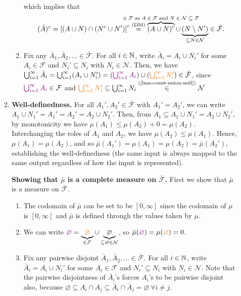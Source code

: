 \begin{enumerate}
\begin{pf}
\begin{enumerate}
\begin{enumerate}[label={(\arabic*)}]
which implies that
\[
(\bar{A})^c=\left[(A\cup N)\cap(N^c\cup N')\right]^{c}
\overset{\text{(DM)}}{=}
\overbrace{(A\cup N)^{c}}^{
\mathclap{\text{\(\in\mathcal{F}\) as \(A\in\mathcal{F}\) and \(N\in\mathcal{N}\subseteq \mathcal{F}\)}}}
\cup \underbrace{(N\setminus N')}_{\subseteq N\in\mathcal{N}}
\in\bar{\mathcal{F}}.
\]
\item Fix any
\(\bar{A}_1,\bar{A}_2,\dotsc\in\bar{\mathcal{F}}\). For all
\(i\in\mathbb{N}\), write \(\bar{A}_i=A_i\cup N_i'\) for some
\(A_i\in\mathcal{F}\) and \(N_i'\subseteq N_i\) with \(N_i\in\mathcal{N}\).
Then, we have \(\bigcup_{i=1}^{\infty}\bar{A}_i
=\bigcup_{i=1}^{\infty}(A_i\cup N_i')
=(\vc{\bigcup_{i=1}^{\infty}A_i})\cup(\orc{\bigcup_{i=1}^{\infty}N_i'})\in\bar{\mathcal{F}}
\), since \(\vc{\bigcup_{i=1}^{\infty}A_i}\in\mathcal{F}\) and
\(\orc{\bigcup_{i=1}^{\infty}N_i'}\subseteq
\bigcup_{i=1}^{\infty}N_i\overset{\text{(\Cref{lma:count-union-null})}}{\in}\mathcal{N}\)
\end{enumerate}
\item \textbf{Well-definedness.} For all
\(A_1',A_2'\in\bar{\mathcal{F}}\) with \(A_1'=A_2'\), we can write
\(A_1\cup N_1'=A_1'=A_2'=A_2\cup N_2'\). Then, from \(A_1\subseteq A_1\cup
N_1'=A_2\cup N_2'\), by monotonicity we have
\(\mu(A_1)\le\mu(A_2)+0=\mu(A_2)\). Interchanging the roles of \(A_1\) and
\(A_2\), we have \(\mu(A_2)\le\mu(A_1)\). Hence, \(\mu(A_1)=\mu(A_2)\), and so
\(\bar{\mu}(A_1')=\mu(A_1)=\mu(A_2)=\bar{\mu}(A_2')\), establishing
the well-definedness (the same input is always mapped to the same output
regardless of how the input is represented).

\textbf{Showing that \(\bar{\mu}\) is a complete measure on \(\bar{\mathcal{F}}\).}
First we show that \(\bar{\mu}\) is a measure on \(\bar{\mathcal{F}}\).
\begin{enumerate}[label={(\arabic*)}]
\item The codomain of \(\bar{\mu}\) can be set to be \([0,\infty]\) since the
codomain of \(\mu\) is \([0,\infty]\) and \(\bar{\mu}\) is defined through
the values taken by \(\mu\).
\item  We can write
\(\vc{\varnothing}=\underbrace{\orc{\varnothing}}_{\in\mathcal{F}}\cup\underbrace{\varnothing}_{\subseteq
\varnothing\in\mathcal{N}}\), so
\(\bar{\mu}(\vc{\varnothing})=\mu(\orc{\varnothing})=0\).

\item Fix any pairwise disjoint
\(\bar{A}_1,\bar{A}_2,\dotsc\in\bar{\mathcal{F}}\). For all
\(i\in\mathbb{N}\), write \(\bar{A}_i=A_i\cup N_i'\) for some
\(A_i\in\mathcal{F}\) and \(N_i'\subseteq N_i\) with \(N_i\in\mathcal{N}\).
Note that the pairwise disjointness of \(\bar{A}_i\)'s forces \(A_i\)'s
to be pairwise disjoint also, because \(\varnothing\subseteq A_i\cap
A_j\subseteq \bar{A}_i\cap\bar{A}_j=\varnothing~\forall i\ne j\).


\end{enumerate}
\end{enumerate}
\end{pf}
\end{enumerate}
